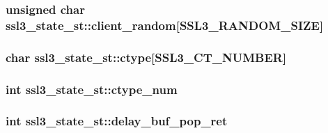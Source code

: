 \subsubsection[{\texorpdfstring{client\+\_\+random}{client_random}}]{\setlength{\rightskip}{0pt plus 5cm}unsigned char ssl3\+\_\+state\+\_\+st\+::client\+\_\+random\mbox{[}{\bf S\+S\+L3\+\_\+\+R\+A\+N\+D\+O\+M\+\_\+\+S\+I\+ZE}\mbox{]}}\hypertarget{structssl3__state__st_a08ccdbf1359a0d714bb7c1934dc3e7d4}{}\label{structssl3__state__st_a08ccdbf1359a0d714bb7c1934dc3e7d4}
\subsubsection[{\texorpdfstring{ctype}{ctype}}]{\setlength{\rightskip}{0pt plus 5cm}char ssl3\+\_\+state\+\_\+st\+::ctype\mbox{[}{\bf S\+S\+L3\+\_\+\+C\+T\+\_\+\+N\+U\+M\+B\+ER}\mbox{]}}\hypertarget{structssl3__state__st_a65ddb0775c351be79fa78d1ef47da80b}{}\label{structssl3__state__st_a65ddb0775c351be79fa78d1ef47da80b}
\subsubsection[{\texorpdfstring{ctype\+\_\+num}{ctype_num}}]{\setlength{\rightskip}{0pt plus 5cm}int ssl3\+\_\+state\+\_\+st\+::ctype\+\_\+num}\hypertarget{structssl3__state__st_abcd044d7a828ba88bc0ceb8b49306a71}{}\label{structssl3__state__st_abcd044d7a828ba88bc0ceb8b49306a71}
\subsubsection[{\texorpdfstring{delay\+\_\+buf\+\_\+pop\+\_\+ret}{delay_buf_pop_ret}}]{\setlength{\rightskip}{0pt plus 5cm}int ssl3\+\_\+state\+\_\+st\+::delay\+\_\+buf\+\_\+pop\+\_\+ret}\hypertarget{structssl3__state__st_a27a3b6185c010f82d22bfcd7feb5a43f}{}\label{structssl3__state__st_a27a3b6185c010f82d22bfcd7feb5a43f}
